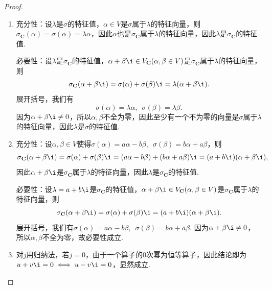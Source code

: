 \begin{proof}
    \begin{enumerate}
        \item 充分性：设$\lambda$是$\sigma$的特征值，$\alpha\in V$是$\sigma$属于$\lambda$的特征向量，则$\sigma_{\mathbf{C}}(\alpha)=\sigma(\alpha)=\lambda\alpha$，因此$\alpha$也是$\sigma_{\mathbf{C}}$属于$\lambda$的特征向量，因此$\lambda$是$\sigma_{\mathbf{C}}$的特征值.

              必要性：设$\lambda$是$\sigma_{\mathbf{C}}$的特征值，$\alpha+\beta\i\in V_{\mathbf{C}}(\alpha,\beta\in V)$是$\sigma_{\mathbf{C}}$属于$\lambda$的特征向量，则
              \[\sigma_{\mathbf{C}}(\alpha+\beta\i)=\sigma(\alpha)+\sigma(\beta)\i=\lambda(\alpha+\beta\i).\]
              展开括号，我们有
              \[\sigma(\alpha)=\lambda\alpha,\enspace \sigma(\beta)=\lambda\beta.\]
              因为$\alpha+\beta\i\neq 0$，所以$\alpha,\beta$不全为零，因此至少有一个不为零的向量是$\sigma$属于$\lambda$的特征向量，因此$\lambda$是$\sigma$的特征值.
        \item 充分性：设$\alpha,\beta\in V$使得$\sigma(\alpha)=a\alpha-b\beta,\enspace \sigma(\beta)=b\alpha+a\beta$，则
              \[\sigma_{\mathbf{C}}(\alpha+\beta\i)=\sigma(\alpha)+\sigma(\beta)\i=(a\alpha-b\beta)+(b\alpha+a\beta)\i=(a+b\i)(\alpha+\beta\i),\]
              因此$\alpha+\beta\i$是$\sigma_{\mathbf{C}}$属于$\lambda$的特征向量，因此$\lambda$是$\sigma_{\mathbf{C}}$的特征值.

              必要性：设$\lambda=a+b\i$是$\sigma_{\mathbf{C}}$的特征值，$\alpha+\beta\i\in V_{\mathbf{C}}(\alpha,\beta\in V)$是$\sigma_{\mathbf{C}}$属于$\lambda$的特征向量，则
              \[\sigma_{\mathbf{C}}(\alpha+\beta\i)=\sigma(\alpha)+\sigma(\beta)\i=(a+b\i)(\alpha+\beta\i).\]
              展开括号，我们有$\sigma(\alpha)=a\alpha-b\beta,\enspace \sigma(\beta)=b\alpha+a\beta$. 因为$\alpha+\beta\i\neq 0$，所以$\alpha,\beta$不全为零，故必要性成立.
        \item 对$j$用归纳法，若$j=0$，由于一个算子的$0$次幂为恒等算子，因此结论即为$u+v\i=0 \iff u-v\i=0$，显然成立.


\end{enumerate}
\end{proof}
